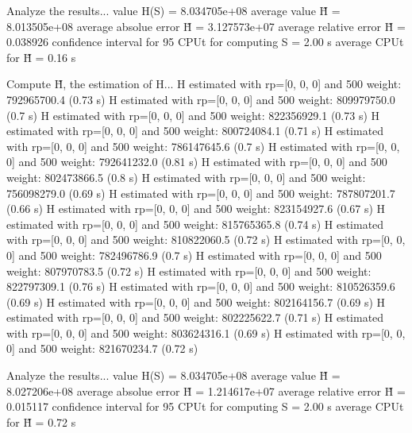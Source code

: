 Analyze the results...
  value H(S)                  = 8.034705e+08 
  average value H̃             = 8.013505e+08 
  average absolue error H̃     = 3.127573e+07 
  average relative error H̃    = 0.038926 
  confidence interval for 95%
  CPUt for computing S         = 2.00 s
  average CPUt for H̃           = 0.16 s

Compute H̃, the estimation of H...
  H estimated with rp=[0, 0, 0] and 500 weight:  792965700.4  (0.73 s)
  H estimated with rp=[0, 0, 0] and 500 weight:  809979750.0  (0.7 s)
  H estimated with rp=[0, 0, 0] and 500 weight:  822356929.1  (0.73 s)
  H estimated with rp=[0, 0, 0] and 500 weight:  800724084.1  (0.71 s)
  H estimated with rp=[0, 0, 0] and 500 weight:  786147645.6  (0.7 s)
  H estimated with rp=[0, 0, 0] and 500 weight:  792641232.0  (0.81 s)
  H estimated with rp=[0, 0, 0] and 500 weight:  802473866.5  (0.8 s)
  H estimated with rp=[0, 0, 0] and 500 weight:  756098279.0  (0.69 s)
  H estimated with rp=[0, 0, 0] and 500 weight:  787807201.7  (0.66 s)
  H estimated with rp=[0, 0, 0] and 500 weight:  823154927.6  (0.67 s)
  H estimated with rp=[0, 0, 0] and 500 weight:  815765365.8  (0.74 s)
  H estimated with rp=[0, 0, 0] and 500 weight:  810822060.5  (0.72 s)
  H estimated with rp=[0, 0, 0] and 500 weight:  782496786.9  (0.7 s)
  H estimated with rp=[0, 0, 0] and 500 weight:  807970783.5  (0.72 s)
  H estimated with rp=[0, 0, 0] and 500 weight:  822797309.1  (0.76 s)
  H estimated with rp=[0, 0, 0] and 500 weight:  810526359.6  (0.69 s)
  H estimated with rp=[0, 0, 0] and 500 weight:  802164156.7  (0.69 s)
  H estimated with rp=[0, 0, 0] and 500 weight:  802225622.7  (0.71 s)
  H estimated with rp=[0, 0, 0] and 500 weight:  803624316.1  (0.69 s)
  H estimated with rp=[0, 0, 0] and 500 weight:  821670234.7  (0.72 s)

Analyze the results...
  value H(S)                  = 8.034705e+08 
  average value H̃             = 8.027206e+08 
  average absolue error H̃     = 1.214617e+07 
  average relative error H̃    = 0.015117 
  confidence interval for 95%
  CPUt for computing S         = 2.00 s
  average CPUt for H̃           = 0.72 s

